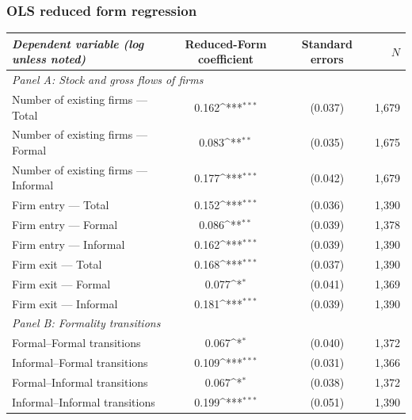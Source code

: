 \documentclass[aspectratio=169]{beamer}
\newcommand{\sym}[1]{\ifmmode^{#1}\else\(^{#1}\)\fi}
\begin{document}
\begin{frame}[noframenumbering]
\frametitle{\textbf{OLS reduced form regression}} \label{ols}

\begin{center}
    \scriptsize
    \begin{tabular}{lccr}
        \toprule
        \textit{Dependent variable (log unless noted)} & Reduced-Form coefficient & Standard errors & $N$ \\
        \midrule
        \multicolumn{4}{l}{\textit{Panel A: Stock and gross flows of firms}} \\
        Number of existing firms --- Total       & \phantom{$-$}0.162\sym{***} & (0.037) & 1{,}679 \\
        Number of existing firms --- Formal      & \phantom{$-$}0.083\sym{**}  & (0.035) & 1{,}675 \\
        Number of existing firms --- Informal    & \phantom{$-$}0.177\sym{***} & (0.042) & 1{,}679 \\
        Firm entry --- Total                     & \phantom{$-$}0.152\sym{***} & (0.036) & 1{,}390 \\
        Firm entry --- Formal                    & \phantom{$-$}0.086\sym{**}  & (0.039) & 1{,}378 \\
        Firm entry --- Informal                  & \phantom{$-$}0.162\sym{***} & (0.039) & 1{,}390 \\
        Firm exit --- Total                      & \phantom{$-$}0.168\sym{***} & (0.037) & 1{,}390 \\
        Firm exit --- Formal                     & \phantom{$-$}0.077\sym{*}   & (0.041) & 1{,}369 \\
        Firm exit --- Informal                   & \phantom{$-$}0.181\sym{***} & (0.039) & 1{,}390 \\
        \midrule
        \multicolumn{4}{l}{\textit{Panel B: Formality transitions}} \\
        Formal--Formal transitions               & \phantom{$-$}0.067\sym{*}   & (0.040) & 1{,}372 \\
        Informal--Formal transitions             & \phantom{$-$}0.109\sym{***} & (0.031) & 1{,}366 \\
        Formal--Informal transitions             & \phantom{$-$}0.067\sym{*}   & (0.038) & 1{,}372 \\
        Informal--Informal transitions           & \phantom{$-$}0.199\sym{***} & (0.051) & 1{,}390 \\
        \bottomrule
    \end{tabular}
\end{center}

\hyperlink{robustness}{}

\end{frame}
\end{document}

